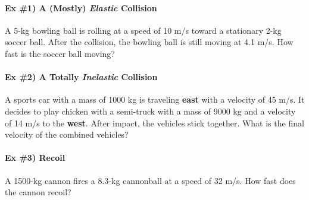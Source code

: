 \documentclass[12pt]{article}
\begin{document}
\pagestyle{empty}

\paragraph{Ex \#1) A (Mostly) \emph{Elastic} Collision} 

A 5-kg bowling ball is rolling at a speed of 10 m/s toward a stationary 2-kg soccer ball.  After the collision, the bowling ball is still moving at 4.1 m/s.  How fast is the soccer ball moving?

\pagebreak

\paragraph{Ex \#2) A Totally \emph{Inelastic} Collision} 

A sports car with a mass of 1000 kg is traveling {\bf east} with a velocity of 45 m/s. It decides to play chicken with a semi-truck with a mass of 9000 kg and a velocity of 14 m/s to the {\bf west}. After impact, the vehicles stick together. What is the final velocity of the combined vehicles?

\pagebreak


\paragraph{Ex \#3) Recoil} 

A 1500-kg cannon fires a 8.3-kg cannonball at a speed of 32 m/s.  How fast does the cannon recoil?
\end{document}
